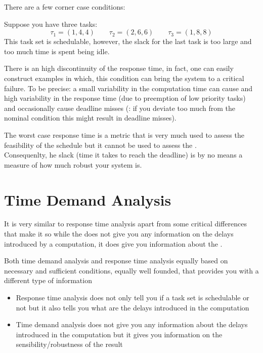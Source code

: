 There are a few corner case conditions:

Suppose you have three tasks:
\[\tau_1 = (1,4,4)\qquad \tau_2 = (2,6,6)\qquad \tau_3 = (1,8,8)\]
This task set is schedulable, however, the slack for the last task is too large and too much time is spent being idle.

There is an high discontinuity of the response time, in fact, one can easily construct examples in which, this condition can bring the system to a critical failure. To be precise: a small variability in the computation time can cause and high variability in the response time (due to preemption of low priority tasks) and occasionally cause deadline misses (: if you deviate too much from the nominal condition this might result in deadline misses).

The worst case response time is a metric that is very much used to assess the feasibility of the schedule but it cannot be used to assess the .\\
Consequenlty, he slack (time it takes to reach the deadline) is by no means a measure of how much robust your system is.


\section{Time Demand Analysis}

It is very similar to response time analysis apart from some critical differences that make it so while the  does not give you any information on the delays introduced by a computation, it does give you information about the .

Both time demand analysis and response time analysis equally based on necessary and sufficient conditions, equally well founded, that provides you with a different type of information
\begin{itemize}
\item Response time analysis does not only tell you if a task set is schedulable or not but it also tells you what are the delays introduced in the computation
\item Time demand analysis does not give you any information about the delays introduced in the computation but  it gives you information on the sensibility/robustness of the result
\end{itemize}

